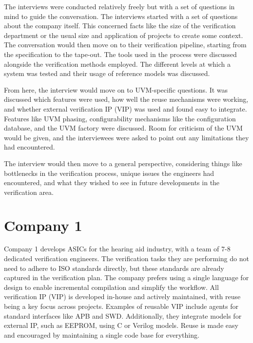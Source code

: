 The interviews were conducted relatively freely but with a set of questions in mind to guide the conversation. The
interviews started with a set of questions about the company itself. This concerned facts like the size of the
verification department or the usual size and application of projects to create some context. The conversation would then move on to their
verification pipeline, starting from the specification to the tape-out. The tools used in the process were
discussed alongside the verification methods employed. The different levels at which a system was tested and their usage of reference models was discussed.

From here, the interview would move on to UVM-specific questions. It was discussed which features were used, how
well the reuse mechanisms were working, and whether external verification IP (VIP) was used and found easy to integrate. Features like UVM
phasing, configurability mechanisms like the configuration database, and the UVM factory were discussed. Room for
criticism of the UVM would be given, and the interviewees were asked to point out any limitations they had encountered.

The interview would then move to a general perspective, considering things like bottlenecks in the
verification process, unique issues the engineers had encountered, and what they wished to see in future developments
in the verification area.

\section{Company 1} %

Company 1 develops ASICs for the hearing aid industry, with a team of 7-8 dedicated verification engineers. The
verification tasks they are performing do not need to adhere to ISO standards directly, but these standards are
already captured in the verification plan. The company prefers using a single language for design to enable
incremental compilation and simplify the workflow. All verification IP (VIP) is developed in-house and actively
maintained, with reuse being a key focus across projects. Examples of reusable VIP include agents for standard interfaces like
APB and SWD. Additionally, they integrate models for external IP, such as EEPROM, using C or Verilog models. Reuse is
made easy and encouraged by maintaining a single code base for everything.

